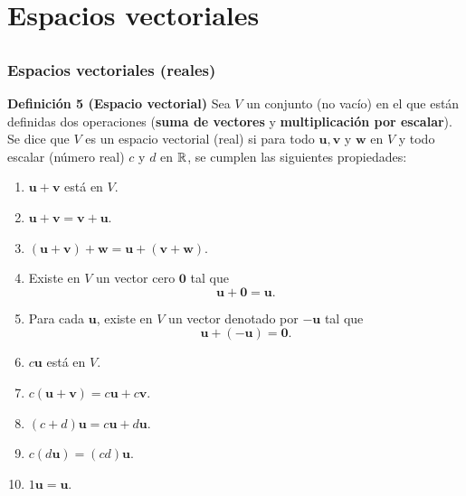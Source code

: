 \section{Espacios vectoriales}

\subsection{}

{\nologo
\begin{frame}\frametitle{Espacios vectoriales (reales)}

\vspace{-3mm}
\begin{block}{\textbf{Definición 5 (Espacio vectorial)}}	
	\justifying
	Sea $V$ un conjunto (no vacío) en el que están definidas dos operaciones (\textbf{suma de vectores} y 
	\textbf{multiplicación por escalar}). Se dice que $V$ es un {\color{red} espacio vectorial (real)} si para todo
	$\mathbf{u}, \mathbf{v}$ y $\mathbf{w}$ en $V$ y todo escalar (número real) $c$ y $d$ en $\mathbb{R}$, se 
	cumplen las siguientes propiedades: 
	\begin{multicols}{2}		
		\begin{enumerate}			
			\justifying
			\item $\mathbf{u}+\mathbf{v}$ está en $V$. \\[4mm]			
			\item $\mathbf{u}+\mathbf{v} = \mathbf{v}+\mathbf{u}$. \\[3mm]			
			\item $(\mathbf{u}+\mathbf{v})+\mathbf{w} = \mathbf{u}+(\mathbf{v}+\mathbf{w})$. \\[4mm]			
			\item Existe en $V$ un vector cero $\mathbf{0}$ tal que
			\[
			\mathbf{u}+\mathbf{0} = \mathbf{u}.
			\]
			
			\vspace{2mm}	
			\item Para cada $\mathbf{u}$, existe en $V$ un vector denotado por $-\mathbf{u}$ tal que
			\[
			\mathbf{u}+(-\mathbf{u}) = \mathbf{0}.
			\]	
			\columnbreak
			\item $c\mathbf{u}$ está en $V$. \\[4mm]			
			\item $c(\mathbf{u}+\mathbf{v}) = c\mathbf{u} + c\mathbf{v}$. \\[3mm]
			\item $(c+d)\mathbf{u} = c\mathbf{u} + d\mathbf{u}$. \\[4mm]
			\item $c(d\mathbf{u}) = (cd)\mathbf{u}$. \\[1.1cm]
			\item $1\mathbf{u} = \mathbf{u}$.
		\end{enumerate}		
	\end{multicols}
	
	\vspace{-8mm}
\end{block}

\end{frame}
}

